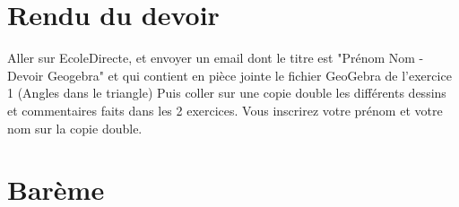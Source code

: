 \documentclass[answers]{exam}
\begin{document}
\begin{questions}

\end{questions}


\section*{Rendu du devoir}

\begin{questions}

\question Aller sur EcoleDirecte, et envoyer un email dont le titre est "Prénom Nom - Devoir Geogebra" et qui contient en pièce jointe le fichier GeoGebra de l'exercice 1 (Angles dans le triangle)
\question Puis coller sur une copie double les différents dessins et commentaires faits dans les 2 exercices. Vous inscrirez votre prénom et votre nom sur la copie double.
\end{questions}

\section*{Barème}
\renewcommand{\arraystretch}{1.7}
\end{document}
